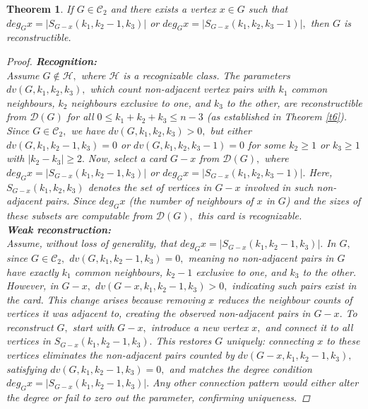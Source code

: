 \documentclass[11pt,oneside]{article}
\newtheorem{thm}{Theorem}
\theoremstyle{definition}
\begin{document}
\begin{thm}\label{t8}
If $G \in \mathscr{C}_2$ and there exists a vertex $x \in G$ such that $deg_{G}x=|S_{G-x}(k_1,k_2-1,k_3)|$ or $deg_{G}x=|S_{G-x}(k_1,k_2,k_3-1)|,$ then $G$ is reconstructible.
\begin{proof}
\textbf{Recognition:}\\ Assume  $G \notin \mathscr{H},$ where $\mathscr{H}$ is a recognizable class. The parameters $dv(G,k_1,k_2,k_3),$ which count non-adjacent vertex pairs with $k_1$ common neighbours, $k_2$ neighbours exclusive to one, and $k_3$ to the other, are reconstructible  from  $\mathscr{D}(G)$ for all $0 \leq k_1+k_2+k_3 \leq n-3$ (as established in Theorem \ref{t6}). Since $G \in \mathscr{C}_2,$ we have $dv(G,k_1,k_2,k_3)>0,$ but either $dv(G,k_1,k_2-1,k_3)=0$ or $dv(G,k_1,k_2,k_3-1)=0$ for some $k_2 \geq 1$ or $k_3 \geq 1$ with $|k_2-k_3|\geq 2.$   Now, select a card $G-x$ from $\mathscr{D}(G),$ where $deg_{G}x= |S_{G-x}(k_1,k_2-1,k_3)|$ or $deg_{G}x=|S_{G-x}(k_1,k_2,k_3-1)|.$ Here, $S_{G-x}(k_1,k_2,k_3)$  denotes the set of vertices in  $G-x$ involved in such non-adjacent pairs. Since $deg_{G}x$ (the number of neighbours of $x$ in $G$) and the sizes of these subsets are computable from  $\mathscr{D}(G),$ this card is recognizable.\\
\textbf{Weak reconstruction:}\\ Assume, without loss of generality, that $deg_{G}x= |S_{G-x}(k_1,k_2-1,k_3)|.$ In $G,$ since $G \in \mathscr{C}_2,$ $dv(G,k_1,k_2-1,k_3)=0,$ meaning no non-adjacent pairs in $G$ have exactly $k_1$ common neighbours, $k_2-1$ exclusive to one, and $k_3$ to the other. However, in $G-x,$  $dv(G-x,k_1,k_2-1,k_3)>0,$ indicating such pairs exist in the card. This change arises because removing $x$ reduces the neighbour counts of vertices it was adjacent to, creating the observed non-adjacent pairs in $G-x.$ To reconstruct $G,$ start with $G-x,$ introduce a new vertex $x,$ and connect it to all vertices in $S_{G-x}(k_1,k_2-1,k_3).$ This restores $G$ uniquely: connecting $x$ to these vertices eliminates the non-adjacent pairs counted by  $dv(G-x,k_1,k_2-1,k_3),$  satisfying $dv(G,k_1,k_2-1,k_3)=0,$ and matches the degree condition $deg_{G}x= |S_{G-x}(k_1,k_2-1,k_3)|.$ Any other connection pattern would either alter the degree or fail to zero out the parameter, confirming uniqueness.
\end{proof}
\end{thm}
   
\end{document}
